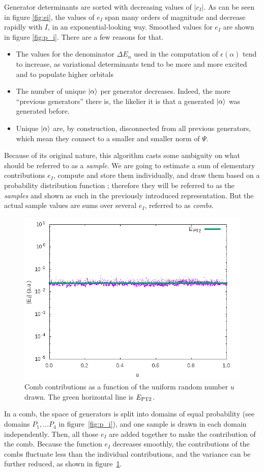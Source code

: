 \documentclass[./thesis.tex]{subfiles}
\begin{document}
Generator determinants are sorted with decreasing values of $|c_I|$.
As can be seen in figure \ref{fig:ei}, the values of $e_I$ span many orders of magnitude and decrease rapidly with $I$, in an exponential-looking way. Smoothed values for $e_I$ are shown in figure \ref{fig:p_i}. There are a few reasons for that.
\begin{itemize}
	\item
	The values for the denominator $\Delta E_\alpha$ used in the computation of $\epsilon(\alpha)$ tend to increase, as variational determinants tend to be more and more excited and to populate higher orbitals 
	\item
	The number of unique $\ket \alpha$ per generator decreases. Indeed, the more ``previous generators'' there is, the likelier it is that a generated $\ket \alpha$ was generated before.
	\item
	Unique $\ket \alpha$ are, by construction, disconnected from all previous generators, which mean they connect to a smaller and smaller norm of $\Psi$.
\end{itemize}


Because of its original nature, this algorithm casts some ambiguity on what should be referred to as a \emph{sample}. We are going to estimate a sum of elementary contributions $e_I$, compute and store them individually, and draw them based on a probability distribution function ; therefore they will be referred to as the \emph{samples} and shown as such in the previously introduced representation. But the actual sample values are sums over several $e_I$, referred to as \emph{combs}.

\begin{figure}[h!]
	\begin{center}
		\includegraphics[width=0.7\columnwidth]{figures/pt2/comb_variance}
	\end{center}
		\caption{Comb contributions as a function of the uniform random number $u$ drawn. The green horizontal line is $E_\text{PT2}$.}
		\label{fig:ei_comb}
\end{figure}
In a comb, the space of generators is split into domains of equal probability (see
domains $P_1, \dots P_4$ in figure~\ref{fig:p_i}), and
one sample is drawn in each domain independently. Then, all those $e_I$ are added together to make the contribution of the comb. Because the function $e_I$ decreases smoothly, the contributions of the combs fluctuate less than the individual contributions, and the variance can be further reduced, as shown in figure~\ref{fig:ei_comb}.
\end{document}
